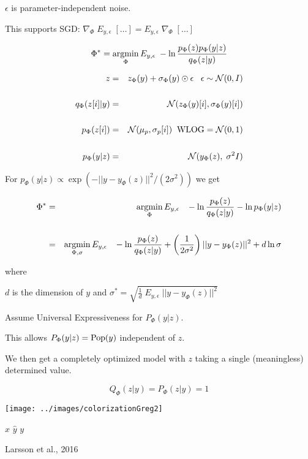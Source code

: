 {\vfill
$\epsilon$ is parameter-independent noise.

\vfill
This supports SGD: $\nabla_\Phi \;E_{y,\epsilon}\; [\ldots] = E_{y,\epsilon}\; \nabla_\Phi\;[\ldots]$

$$\Phi^* = \operatorname*{argmin}_\Phi E_{y,\epsilon}\;-\ln \frac{p_\Phi(z)p_\Phi(y|z)}{q_\Phi(z|y)}$$

{\color{red}
\begin{eqnarray*}
z & = & z_\Phi(y) + \sigma_\Phi(y) \odot \epsilon\;\;\;\epsilon \sim {\cal N}(0,I) \\
\\
q_\Phi(z[i]|y) & = & {\cal N}(z_\Phi(y)[i],\sigma_\Phi(y)[i]) \\
\\
p_\Phi(z[i]) & = & {\cal N}(\mu_p,\sigma_p[i]) \;\;\mbox{WLOG} = {\cal N}(0,1) \\
\\
p_\Phi(y|z) & = & {\cal N}(y_\Phi(z),\;\sigma^2I)
\end{eqnarray*}
}


For $p_\Phi(y|z) \propto \exp(-||y - y_\Phi(z)||^2/(2\sigma^2))$ we get

\begin{eqnarray*}
\Phi^* & = & \operatorname*{argmin}_{\Phi} E_{y,\epsilon}\;\;\;-\ln \frac{p_\Phi(z)}{q_\Phi(z|y)} - \ln p_\Phi(y|z) \\
\\
       & = & \operatorname*{argmin}_{\Phi,\sigma} E_{y,\epsilon}\;\;\;-\ln \frac{p_\Phi(z)}{q_\Phi(z|y)} +\left(\frac{1}{2\sigma^2}\right)||y - y_\Phi(z)||^2 + d\ln \sigma
\end{eqnarray*}

\vfill
where

\centerline{$d$ is the dimension of $y$ and $\sigma^*  =  \sqrt{\frac{1}{d}\;E_{y,\epsilon}\; ||y - y_\Phi(z)||^2}$}


Assume Universal Expressiveness for $P_\Phi(y|z)$.

\vfill
This allows $P_\Phi(y|z) = \mathrm{Pop}(y)$ independent of $z$.

\vfill
We then get a completely optimized model with $z$ taking a single (meaningless) determined value.

\vfill
$$Q_\Phi(z|y) = P_\Phi(z|y) = 1$$

\medskip
\centerline{\texttt{[image: ../images/colorizationGreg2]}}
\centerline{$x$ \hspace{4em} $\hat{y}$ \hspace{4em} $y$}
\centerline{\huge Larsson et al., 2016}

}
